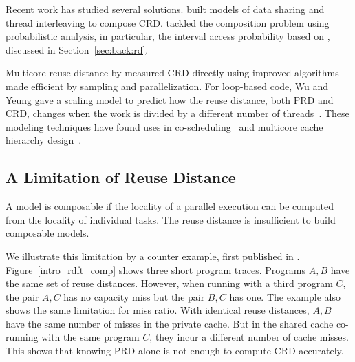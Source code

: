Recent work has studied several solutions.  \citet{DingC:MSR09} built
models of data sharing and thread interleaving to compose CRD.
\citet{Jiang+:CC10} tackled the composition problem using probabilistic
analysis, in particular, the interval access probability based on
\cite{Shen+:POPL07}, discussed in Section~\ref{sec:back:rd}.

Multicore reuse distance by
\citet{Schuff+:PACT10} measured CRD directly using improved algorithms
made efficient by sampling and parallelization.  For loop-based code,
Wu and Yeung gave a scaling model to predict how the reuse distance,
both PRD and CRD, changes when the work is divided by a different
number of threads~\citep{WuY:PACT11}.  These modeling techniques have
found uses in co-scheduling~\citep{Jiang+:HiPEAC10} and multicore
cache hierarchy design~\citep{WuY:MSPC12,WuY:PACT11,Wu+:ISCA13}.

\subsection{A Limitation of Reuse Distance}
\label{sec:rd:limit}

A model is composable if the locality of a parallel execution can be
computed from the locality of individual tasks.  The reuse distance is
insufficient to build composable models.  


We illustrate this limitation by a counter example, first published in \citep{Xiang+:PPOPP11}.
Figure~\ref{intro_rdft_comp} shows three short
program traces.  Programs $A,B$ have the same set of reuse distances.
However, when running with a third program $C$, the pair $A,C$ has no
capacity miss but the pair $B,C$ has one.  The example also shows the
same limitation for miss ratio.  With identical reuse distances,
$A,B$ have the same number of misses in the private cache.  
But in the shared cache co-running with the same program $C$,
they incur a different number of cache misses.  This shows
that knowing PRD alone is not enough to compute CRD accurately.

